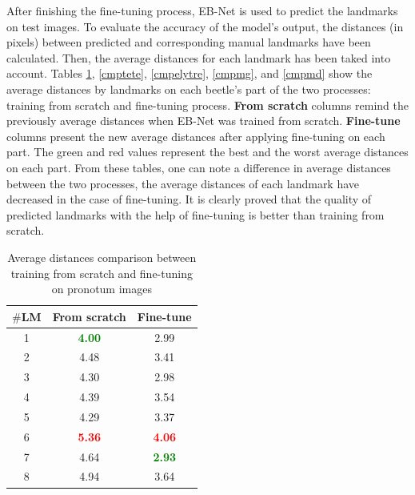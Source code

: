 \documentclass[review]{elsarticle}
\begin{document}
After finishing the fine-tuning process, EB-Net is used to predict the landmarks on test images. To evaluate the accuracy of the model's output, the distances (in pixels) between predicted and corresponding manual landmarks have been calculated. Then, the average distances for each landmark has been taked into account. Tables \ref{cmppronotum}, \ref{cmptete}, \ref{cmpelytre}, \ref{cmpmg}, and \ref{cmpmd} show the average distances by landmarks on each beetle's part of the two processes: training from scratch and fine-tuning process. \textbf{From scratch} columns remind the previously average distances when EB-Net was trained from scratch. \textbf{Fine-tune} columns present the new average distances after applying fine-tuning on each part. The green and red values represent the best and the worst average distances on each part. From these tables, one can note a difference in average distances between the two processes, the average distances of each landmark have decreased in the case of fine-tuning. It is clearly proved that the quality of predicted landmarks with the help of fine-tuning is better than training from scratch.
\begin{table}[htbp]
	\centering
	\begin{tabular}{|c|c|c|}
		\hline
		\textbf{$\#$LM} & \textbf{From scratch} & \textbf{Fine-tune} \\ \hline
		1 & \textcolor{green}{\textbf{4.00 }}& 2.99\\ \hline
		2 & 4.48 & 3.41  \\ \hline
		3 & 4.30  & 2.98 \\ \hline
		4 & 4.39  & 3.54\\ \hline
		5 & 4.29  & 3.37 \\ \hline
		6 & \textcolor{red}{\textbf{5.36}}  & \textcolor{red}{\textbf{4.06}} \\ \hline
		7 & 4.64  & \textcolor{green}{\textbf{2.93}} \\ \hline
		8 & 4.94  & 3.64 \\ \hline
	\end{tabular}
	\caption{Average distances comparison between training from scratch and fine-tuning on pronotum images}
	\label{cmppronotum}
\end{table}
\end{document}
